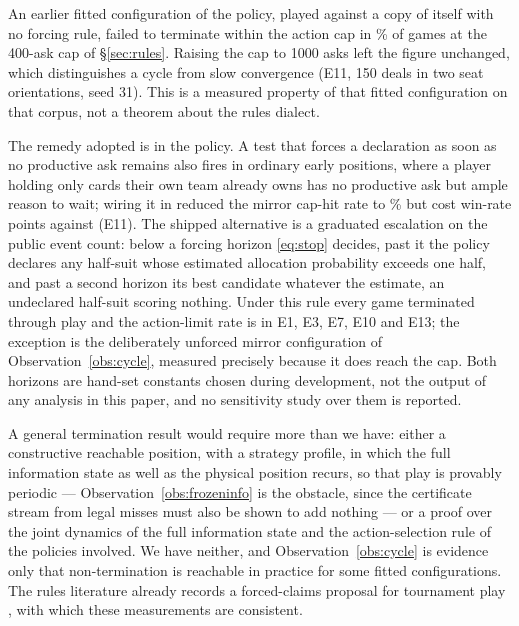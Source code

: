 \begin{observation}
\label{obs:cycle}
An earlier fitted configuration of the policy, played against a copy of itself
with no forcing rule, failed to terminate within the action cap in
\numMirrorCycle\% of games at the 400-ask cap of \S\ref{sec:rules}. Raising the
cap to 1000 asks left the figure unchanged, which distinguishes a cycle from slow
convergence (E11, 150 deals in two seat orientations, seed 31). This is a
measured property of that fitted configuration on that corpus, not a theorem
about the rules dialect.
\end{observation}

The remedy adopted is in the policy. A test that forces a declaration as soon as
no productive ask remains also fires in ordinary early positions, where a player
holding only cards their own team already owns has no productive ask but ample
reason to wait; wiring it in reduced the mirror cap-hit rate to
\numDeadAskCycle\% but cost \numDeadAskCost{} win-rate points against \vthree{}
(E11). The shipped alternative is a graduated escalation on the public event
count: below a forcing horizon \eqref{eq:stop} decides, past it the policy
declares any half-suit whose estimated allocation probability exceeds one half,
and past a second horizon its best candidate whatever the estimate, an
undeclared half-suit scoring nothing. Under this rule every game terminated
through play and the action-limit rate is \numLimitRate{} in E1, E3, E7, E10 and
E13; the exception is the deliberately unforced mirror configuration of
Observation~\ref{obs:cycle}, measured precisely because it does reach the cap.
Both horizons are hand-set constants chosen during development, not the
output of any analysis in this paper, and no sensitivity study over them is
reported.

A general termination result would require more than we have: either a
constructive reachable position, with a strategy profile, in which the full
information state as well as the physical position recurs, so that play is
provably periodic --- Observation~\ref{obs:frozeninfo} is the obstacle, since the
certificate stream from legal misses must also be shown to add nothing --- or a
proof over the joint dynamics of the full information state and the
action-selection rule of the policies involved. We have neither, and
Observation~\ref{obs:cycle} is evidence only that non-termination is reachable in
practice for some fitted configurations. The rules literature
already records a forced-claims proposal for tournament play \cite{pagat}, with
which these measurements are consistent.
